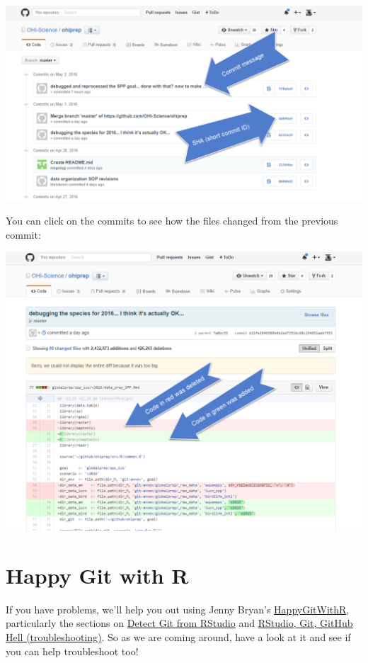 \documentclass[]{book}
\begin{document}
\includegraphics{img/commit_compare_2.png}

You can click on the commits to see how the files changed from the previous commit:

\includegraphics{img/commit_compare_3.png}

\hypertarget{happy-git-with-r}{%
\section{Happy Git with R}\label{happy-git-with-r}}

If you have problems, we'll help you out using Jenny Bryan's \href{http://happygitwithr.com}{HappyGitWithR}, particularly the sections on \href{http://happygitwithr.com/rstudio-see-git.html}{Detect Git from RStudio} and \href{http://happygitwithr.com/troubleshooting.html}{RStudio, Git, GitHub Hell (troubleshooting)}. So as we are coming around, have a look at it and see if you can help troubleshoot too!
\end{document}
